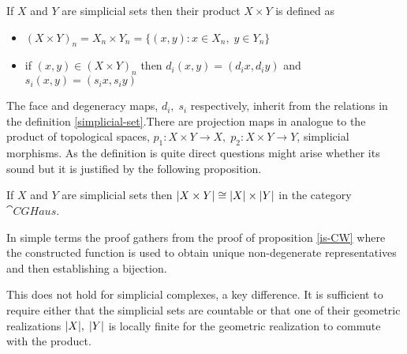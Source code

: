 \documentclass[../../main.tex]{subfiles}
\begin{document}
    \begin{definition}
        If $X$ and $Y$ are simplicial sets then their product $X\times Y$ is defined as 
        \begin{itemize}
            \item $(X\times Y)_n= X_n\times Y_n= \{(x,y):x\in X_n,\; y \in Y_n \}$
            \item if $(x,y)\in (X\times Y)_n$ then $d_i(x,y)=(d_ix,d_iy)$ and $s_i(x,y)=(s_ix,s_iy)$
        \end{itemize}
    \end{definition}
    
    The face and degeneracy maps, $d_i,\; s_i$ respectively, inherit from the relations in the definition \ref{simplicial-set}.There are projection maps in analogue to the product of topological spaces, $p_1:X\times Y \to X,\; p_2:X\times Y \to Y$, simplicial morphisms. As the definition is quite direct questions might arise whether its sound but it is justified by the following proposition.

    \begin{proposition}
        If $X$ and $Y$ are simplicial sets then $\geom[X\times Y]\cong \geom[X]\times \geom[Y]$ in the category $\cat{CGHaus}$.
    \end{proposition}

    In simple terms the proof gathers from the proof of proposition \ref{is-CW} where the constructed function is used to obtain unique non-degenerate representatives and then establishing a bijection. 

    This does not hold for simplicial complexes, a key difference. It is sufficient to require either that the simplicial sets are countable or that one of their geometric realizations $\geom[X],\; \geom[Y]$ is locally finite for the geometric realization to commute with the product. 
\end{document}
